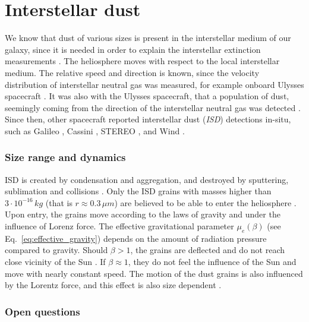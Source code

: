 \section{Interstellar dust}

We know that dust of various sizes is present in the interstellar medium of our galaxy, since it is needed in order to explain the interstellar extinction measurements \citep{desert1990interstellar}. The heliosphere moves with respect to the local interstellar medium. The relative speed and direction is known, since the velocity distribution of interstellar neutral gas was measured, for example onboard Ulysses spacecraft \citep{witte2004kinetic}. It was also with the Ulysses spacecraft, that a population of dust, seemingly coming from the direction of the interstellar neutral gas was detected \citep{grun1993discovery}. Since then, other spacecraft reported interstellar dust (\textit{ISD}) detections in-situ, such as Galileo \citep{baguhl1995flux}, Cassini \citep{altobelli2003cassini}, STEREO \citep{zaslavsky2012interplanetary}, and Wind \citep{malaspina2014interplanetary}. 

\subsubsection{Size range and dynamics}

ISD is created by condensation and aggregation, and destroyed by sputtering, sublimation and collisions \citep{mann2010interstellar}. Only the ISD grains with masses higher than $3\cdot 10^{-16} \, \si{kg}$ (that is $r \approx 0.3 \, \si{\mu m} $) are believed to be able to enter the heliosphere \citep{kimura1998electric}. Upon entry, the grains move according to the laws of gravity and under the influence of Lorenz force. The effective gravitational parameter $\mu_e(\beta)$ (see Eq.~\ref{eq:effective_gravity}) depends on the amount of radiation pressure compared to gravity. Should $\beta > 1$, the grains are deflected and do not reach close vicinity of the Sun \citep{henriksen2022interstellar}. If $\beta \approx 1$, they do not feel the influence of the Sun and move with nearly constant speed. The motion of the dust grains is also influenced by the Lorentz force, and this effect is also size dependent \citep{morfill1979motion}.

\subsubsection{Open questions}


